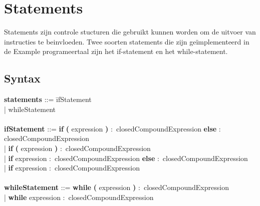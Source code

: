 \section{Statements}
Statements zijn controle stucturen die gebruikt kunnen worden om de uitvoer van instructies te beinvloeden. Twee soorten statements die zijn ge\"{i}mplementeerd in de Example programeertaal zijn het if-statement en het while-statement.
    \subsection{Syntax}
        \begin{tabbing}
        {\bf statements}                  ::= \=ifStatement\\
                                          \>| whileStatement\\
        \\
        {\bf ifStatement}                 ::= \=\textbf{if} \=\textbf{(} expression \textbf{)} $\colon$ closedCompoundExpression \textbf    {else} $\colon$ closedCompoundExpression\\
                                      \>| \textbf{if} \textbf{(} expression \textbf{)} $\colon$ closedCompoundExpression\\
                                      \>| \textbf{if} expression $\colon$ closedCompoundExpression \textbf{else} $\colon$ closedCompoundExpression\\
                                      \>| \textbf{if} expression $\colon$ closedCompoundExpression\\
        \\
        {\bf whileStatement}              ::= \=\textbf{while} \textbf{(} expression \textbf{)} $\colon$ closedCompoundExpression\\
                                      \>| \textbf{while} expression $\colon$ closedCompoundExpression\\
        \\ 
        \end{tabbing}
